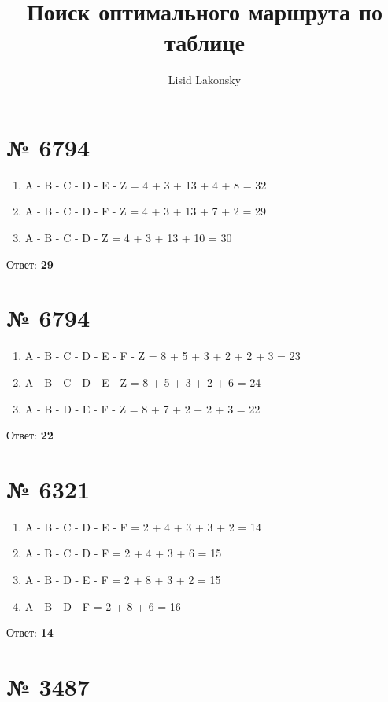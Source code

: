 \documentclass[11pt]{article} %
\title{Поиск оптимального маршрута по таблице}
\author{Lisid Lakonsky}
\begin{document}
\maketitle

\section{№ \textbf{6794}}

\begin{enumerate}
	\item A - B - C - D - E - Z = 4 + 3 + 13 + 4 + 8 = 32
	\item A - B - C - D - F - Z = 4 + 3 + 13 + 7 + 2 = 29
	\item A - B - C - D - Z = 4 + 3 + 13 + 10 = 30
\end{enumerate}

Ответ: \textbf{29}

\section{№ \textbf{6794}}

\begin{enumerate}
	\item A - B - C - D - E - F - Z = 8 + 5 + 3 + 2 + 2 + 3 = 23
	\item A - B - C - D - E - Z = 8 + 5 + 3 + 2 + 6 = 24
	\item A - B - D - E - F - Z = 8 + 7 + 2 + 2 + 3 = 22
\end{enumerate}

Ответ: \textbf{22}

\section{№ \textbf{6321}}

\begin{enumerate}
	\item A - B - C - D - E - F = 2 + 4 + 3 + 3 + 2 = 14
	\item A - B - C - D -  F = 2 + 4 + 3 + 6 = 15
	\item A - B - D - E - F = 2 + 8 + 3 + 2 = 15
	\item A - B - D - F = 2 + 8 + 6 = 16
\end{enumerate}

Ответ: \textbf{14}

\section{№ \textbf{3487}}
\end{document}
